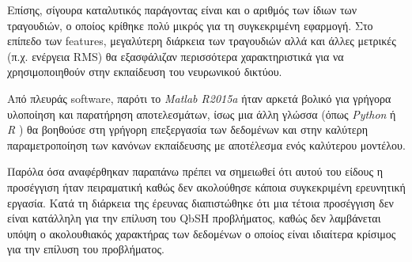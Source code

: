 Επίσης, σίγουρα καταλυτικός παράγοντας είναι και ο αριθμός των ίδιων των τραγουδιών, ο οποίος κρίθηκε πολύ μικρός για τη συγκεκριμένη εφαρμογή. 
Στο επίπεδο των features, μεγαλύτερη διάρκεια των τραγουδιών αλλά και άλλες μετρικές (π.χ. ενέργεια RMS) θα εξασφάλιζαν περισσότερα χαρακτηριστικά για να χρησιμοποιηθούν στην εκπαίδευση του νευρωνικού δικτύου.

Από πλευράς software, παρότι το \textit{Matlab R2015a} \cite{matlab} ήταν αρκετά βολικό για γρήγορα υλοποίηση και παρατήρηση αποτελεσμάτων, ίσως μια άλλη γλώσσα (όπως \textit{Python} \cite{python} ή \textit{R} \cite{r_lang}) θα βοηθούσε στη γρήγορη επεξεργασία των δεδομένων και στην καλύτερη παραμετροποίηση των κανόνων εκπαίδευσης με αποτέλεσμα ενός καλύτερου μοντέλου.

Παρόλα όσα αναφέρθηκαν παραπάνω πρέπει να σημειωθεί ότι αυτού του είδους η προσέγγιση ήταν πειραματική καθώς δεν ακολούθησε κάποια συγκεκριμένη ερευνητική εργασία. 
Κατά τη διάρκεια της έρευνας διαπιστώθηκε ότι μια τέτοια προσέγγιση δεν είναι κατάλληλη για την επίλυση του 
QbSH προβλήματος, καθώς δεν λαμβάνεται υπόψη ο ακολουθιακός χαρακτήρας των δεδομένων ο οποίος είναι ιδιαίτερα 
κρίσιμος για την επίλυση του προβλήματος.
